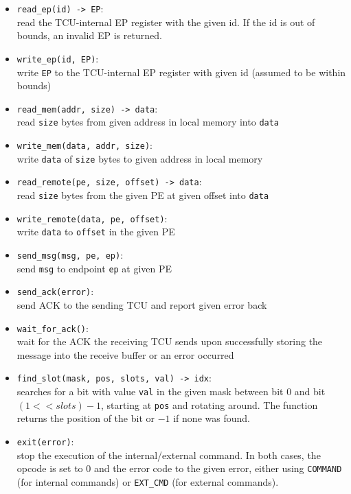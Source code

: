 \documentclass[a4paper,11pt]{article}
\begin{document}
\begin{itemize}
  \item \texttt{read\_ep(id) -> EP}:\\
  read the TCU-internal EP register with the given id. If the id is out of bounds, an invalid EP is
  returned.
  \item \texttt{write\_ep(id, EP)}:\\
  write \texttt{EP} to the TCU-internal EP register with given id (assumed to be within bounds)
  \item \texttt{read\_mem(addr, size) -> data}:\\
  read \texttt{size} bytes from given address in local memory into \texttt{data}
  \item \texttt{write\_mem(data, addr, size)}:\\
  write \texttt{data} of \texttt{size} bytes to given address in local memory
  \item \texttt{read\_remote(pe, size, offset) -> data}:\\
  read \texttt{size} bytes from the given PE at given offset into \texttt{data}
  \item \texttt{write\_remote(data, pe, offset)}:\\
  write \texttt{data} to \texttt{offset} in the given PE
  \item \texttt{send\_msg(msg, pe, ep)}:\\
  send \texttt{msg} to endpoint \texttt{ep} at given PE
  \item \texttt{send\_ack(error)}:\\
  send ACK to the sending TCU and report given error back
  \item \texttt{wait\_for\_ack()}:\\
  wait for the ACK the receiving TCU sends upon successfully storing the message into the receive
  buffer or an error occurred
  \item \texttt{find\_slot(mask, pos, slots, val) -> idx}:\\
  searches for a bit with value \texttt{val} in the given mask between bit 0 and bit $(1 << slots) -
  1$, starting at \texttt{pos} and rotating around. The function returns the position of the bit or
  $-1$ if none was found.
  \item \texttt{exit(error)}:\\
  stop the execution of the internal/external command. In both cases, the opcode is set to 0 and the
  error code to the given error, either using \texttt{COMMAND} (for internal commands) or
  \texttt{EXT\_CMD} (for external commands).
\end{itemize}
\end{document}
